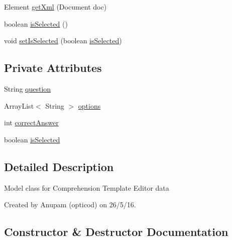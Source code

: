 \begin{DoxyCompactItemize}
\item 
Element \hyperlink{classorg_1_1buildmlearn_1_1toolkit_1_1templates_1_1ComprehensionModel_a6be4aef0eff4bfd37266162154d2e347}{get\+Xml} (Document doc)
\item 
boolean \hyperlink{classorg_1_1buildmlearn_1_1toolkit_1_1templates_1_1ComprehensionModel_a56bf8ed0938488b4be3b707d4280782d}{is\+Selected} ()
\item 
void \hyperlink{classorg_1_1buildmlearn_1_1toolkit_1_1templates_1_1ComprehensionModel_aec3e52fd8541e4478c2386cc3636a663}{set\+Is\+Selected} (boolean \hyperlink{classorg_1_1buildmlearn_1_1toolkit_1_1templates_1_1ComprehensionModel_a35d9c2df0b114ae101174803a3f803c6}{is\+Selected})
\end{DoxyCompactItemize}
\subsection*{Private Attributes}
\begin{DoxyCompactItemize}
\item 
String \hyperlink{classorg_1_1buildmlearn_1_1toolkit_1_1templates_1_1ComprehensionModel_a51f7dca2d72fbd6cbbd8bcaea754d2e2}{question}
\item 
Array\+List$<$ String $>$ \hyperlink{classorg_1_1buildmlearn_1_1toolkit_1_1templates_1_1ComprehensionModel_a382cd02fa193b35fa27ece6b261330fe}{options}
\item 
int \hyperlink{classorg_1_1buildmlearn_1_1toolkit_1_1templates_1_1ComprehensionModel_a2c3c90f22361d85df799d962c1bdba9e}{correct\+Answer}
\item 
boolean \hyperlink{classorg_1_1buildmlearn_1_1toolkit_1_1templates_1_1ComprehensionModel_a35d9c2df0b114ae101174803a3f803c6}{is\+Selected}
\end{DoxyCompactItemize}


\subsection{Detailed Description}
Model class for Comprehension Template Editor data 

Created by Anupam (opticod) on 26/5/16. 

\subsection{Constructor \& Destructor Documentation}
